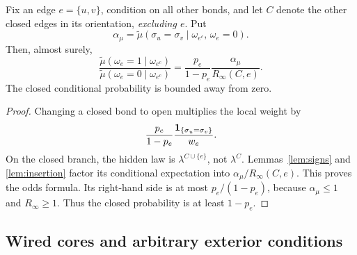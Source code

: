 \begin{lemma}\label{lem:odds}
Fix an edge \(e=\{u,v\}\), condition on all other bonds, and let \(C\) denote the other closed edges in its orientation, \emph{excluding \(e\)}. Put
\begin{equation}
 \alpha_\mu=\widetilde\mu(\sigma_u=\sigma_v\mid
                   \omega_{e^c},\,\omega_e=0).
\end{equation}
Then, almost surely,
\begin{equation}
 \frac{\widetilde\mu(\omega_e=1\mid\omega_{e^c})}
      {\widetilde\mu(\omega_e=0\mid\omega_{e^c})}
 =\frac{p_e}{1-p_e}\frac{\alpha_\mu}{R_\infty(C,e)}.
 \label{eq:odds}
\end{equation}
The closed conditional probability is bounded away from zero.
\end{lemma}
\begin{proof}
Changing a closed bond to open multiplies the local weight by
\begin{equation}
 \frac{p_e}{1-p_e}\frac{\mathbf 1_{\{\sigma_u=\sigma_v\}}}{w_e}.
\end{equation}
On the closed branch, the hidden law is \(\lambda^{C\cup\{e\}}\), not \(\lambda^C\). Lemmas~\ref{lem:signs} and \ref{lem:insertion} factor its conditional expectation into
\(\alpha_\mu/R_\infty(C,e)\). This proves the odds formula. Its right-hand side is at most \(p_e/(1-p_e)\), because \(\alpha_\mu\le1\) and \(R_\infty\ge1\). Thus the closed probability is at least \(1-p_e\).
\end{proof}

\subsection{Wired cores and arbitrary exterior conditions}

